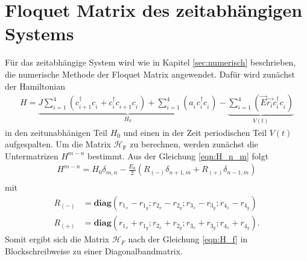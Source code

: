 \section{Floquet Matrix des zeitabhängigen Systems}
Für das zeitabhängige System wird wie
in Kapitel \ref{sec:numerisch} beschrieben, die
numerische Methode der Floquet Matrix angewendet.
Dafür wird zunächst der Hamiltonian
\begin{align}
H=\underbrace{J\sum_{i=1}^4 \left(c_{i+1}^\dag c_i^{\phantom{\dag}} + c_{i}^\dag c_{i+1}^{\phantom{\dag}}c_i^{\phantom{\dag}}\right)
+ \sum_{i=1}^4\left(a_i^{\phantom{\dag}} c_i^\dag c_i^{\phantom{\dag}}\right)}_{H_0}
-\underbrace{\sum_{i=1}^4\left(\vec{E} \vec{r_i}  c_i^\dag c_i^{\phantom{\dag}}\right)}_{V(t)}
\end{align}
in den zeitunabhänigen Teil $H_0$ und einen in der Zeit periodischen Teil $V(t)$ aufgespalten.
Um die Matrix $\mathcal{H}_\mathrm{F}$ zu berechnen, werden zunächst die Untermatrizen $H^{m-n}$ bestimmt.
Aus der Gleichung \eqref{eqn:H_n_m} folgt
\begin{align}
  H^{m-n}=H_0\delta_{m,n} -\frac{E_0}{2}\left(R_{(-)} \delta_{n+1,m}   +  R_{(+)}\delta_{n-1,m}\right)\\
\end{align}
mit
\begin{align}
  R_{(-)}&=\textbf{diag}\left(
  r_{1_x}-r_{1_y} ;
  r_{2_x}-r_{2_y} ;
  r_{3_x}-r_{3_y} ;
  r_{4_x}-r_{4_y}\right)
\\
  R_{(+)}&= \textbf{diag}\left(
  r_{1_x}+r_{1_y} ;
  r_{2_x}+r_{2_y} ;
  r_{3_x}+r_{3_y} ;
  r_{4_x}+r_{4_y}\right).
\end{align}
Somit ergibt sich die Matrix $\mathcal{H}_F$ nach
der Gleichung \eqref{eqn:H_f} in
Blockschreibweise zu einer Diagonalbandmatrix.
